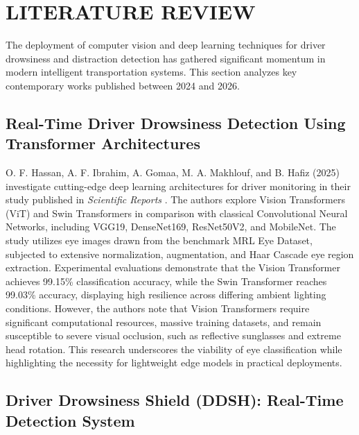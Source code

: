\documentclass[a4paper,12pt]{report}
\begin{document}
\chapter{LITERATURE REVIEW}

The deployment of computer vision and deep learning techniques for driver drowsiness and distraction detection has gathered significant momentum in modern intelligent transportation systems. This section analyzes key contemporary works published between 2024 and 2026.

\section{Real-Time Driver Drowsiness Detection Using Transformer Architectures}

\hspace{1cm}O. F. Hassan, A. F. Ibrahim, A. Gomaa, M. A. Makhlouf, and B. Hafiz (2025) investigate cutting-edge deep learning architectures for driver monitoring in their study published in \textit{Scientific Reports} \cite{ref_transformer}. The authors explore Vision Transformers (ViT) and Swin Transformers in comparison with classical Convolutional Neural Networks, including VGG19, DenseNet169, ResNet50V2, and MobileNet. The study utilizes eye images drawn from the benchmark MRL Eye Dataset, subjected to extensive normalization, augmentation, and Haar Cascade eye region extraction. Experimental evaluations demonstrate that the Vision Transformer achieves 99.15\% classification accuracy, while the Swin Transformer reaches 99.03\% accuracy, displaying high resilience across differing ambient lighting conditions. However, the authors note that Vision Transformers require significant computational resources, massive training datasets, and remain susceptible to severe visual occlusion, such as reflective sunglasses and extreme head rotation. This research underscores the viability of eye classification while highlighting the necessity for lightweight edge models in practical deployments.

\section{Driver Drowsiness Shield (DDSH): Real-Time Detection System}
\end{document}
